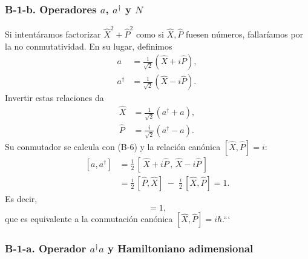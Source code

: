 \documentclass[a4paper,11pt]{article}
\begin{document}
\subsubsection*{B-1-b. Operadores \(a\), \(a^\dagger\) y \(N\)}

Si intentáramos factorizar \(\hat X^2 + \hat P^2\) como si \(\hat X,\hat P\) fuesen números, fallaríamos por la no conmutatividad. En su lugar, definimos
\begin{align}
a        &= \tfrac{1}{\sqrt2}(\hat X + i\hat P),
\tag{B-6a}\\
a^\dagger&= \tfrac{1}{\sqrt2}(\hat X - i\hat P).
\tag{B-6b}
\end{align}
Invertir estas relaciones da
\begin{align}
\hat X &= \tfrac{1}{\sqrt2}(a^\dagger + a),
\tag{B-7a}\\
\hat P &= \tfrac{i}{\sqrt2}(a^\dagger - a).
\tag{B-7b}
\end{align}
Su conmutador se calcula con (B-6) y la relación canónica \([\hat X,\hat P]=i\):
\begin{equation}
\begin{split}
[a,a^\dagger]
&= \tfrac12\,[\,\hat X + i\hat P\,,\,\hat X - i\hat P\,]\\
&= \tfrac{i}{2}\,[\hat P,\hat X] \;-\;\tfrac{i}{2}\,[\hat X,\hat P]
=1.
\end{split}
\tag{B-8}
\end{equation}
Es decir,
\begin{equation}
[a,a^\dagger]=1,
\tag{B-9}
\end{equation}
que es equivalente a la conmutación canónica \([\hat X,\hat P]=i\hbar\).```\subsubsection*{B-1-a. Operador \(a^\dagger a\) y Hamiltoniano adimensional}
\end{document}
